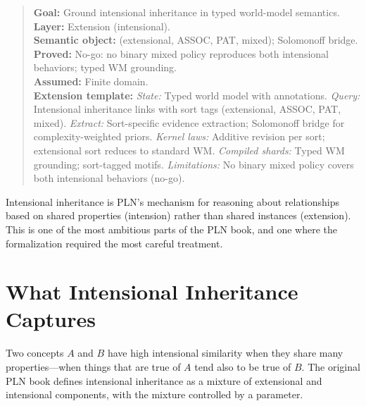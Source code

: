 \documentclass[11pt,openany]{report}
\begin{document}
\begin{quote}\small
\textbf{Goal:} Ground intensional inheritance in typed world-model semantics.\\
\textbf{Layer:} Extension (intensional).\\
\textbf{Semantic object:}  (extensional, ASSOC, PAT, mixed); Solomonoff bridge.\\
\textbf{Proved:} No-go: no binary mixed policy reproduces both intensional behaviors; typed WM grounding.\\
\textbf{Assumed:} Finite domain.\\[4pt]
\textbf{Extension template:}
\textit{State:} Typed world model with  annotations.
\textit{Query:} Intensional inheritance links with sort tags (extensional, ASSOC, PAT, mixed).
\textit{Extract:} Sort-specific evidence extraction; Solomonoff bridge for complexity-weighted priors.
\textit{Kernel laws:} Additive revision per sort; extensional sort reduces to standard WM.
\textit{Compiled shards:} Typed WM grounding; sort-tagged motifs.
\textit{Limitations:} No binary mixed policy covers both intensional behaviors (no-go).
\end{quote}

Intensional inheritance is PLN's mechanism for reasoning about
relationships based on shared properties (intension) rather than shared
instances (extension).  This is one of the most ambitious parts of the
PLN book, and one where the formalization required the most careful
treatment.

\section{What Intensional Inheritance Captures}

Two concepts $A$ and $B$ have high intensional similarity when they share
many properties---when things that are true of $A$ tend also to be true
of $B$.  The original PLN book defines intensional inheritance as a
mixture of extensional and intensional components, with the mixture
controlled by a parameter.

\end{document}
